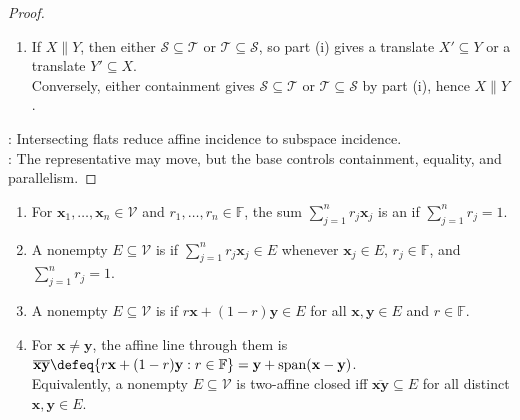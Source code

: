 \begin{proposition}
\begin{proof}
\begin{enumerate}[label=(\roman*)]
\item If $X\parallel Y$, then either $\mathcal{S}\subseteq\mathcal{T}$ or $\mathcal{T}\subseteq\mathcal{S}$, so part (i) gives a translate $X'\subseteq Y$ or a translate $Y'\subseteq X$.\\
Conversely, either containment gives $\mathcal{S}\subseteq\mathcal{T}$ or $\mathcal{T}\subseteq\mathcal{S}$ by part (i), hence $X\parallel Y$.
\end{enumerate}
: Intersecting flats reduce affine incidence to subspace incidence.\\
: The representative may move, but the base controls containment, equality, and parallelism.
\end{proof}
\end{proposition}

\begin{definition} \label{def:affine-combination-and-closed-set} 
\begin{enumerate}[label=(\roman*)]
\setlength{\itemsep}{0pt}
\item For $\mathbf{x}_1,\ldots,\mathbf{x}_n\in\mathcal{V}$ and $r_1,\ldots,r_n\in\mathbb{F}$, the sum $\sum_{j=1}^n r_j\mathbf{x}_j$ is an  if $\sum_{j=1}^n r_j=1$.
\item A nonempty $E\subseteq\mathcal{V}$ is  if $\sum_{j=1}^n r_j\mathbf{x}_j\in E$ whenever $\mathbf{x}_j\in E$, $r_j\in\mathbb{F}$, and $\sum_{j=1}^n r_j=1$.
\item A nonempty $E\subseteq\mathcal{V}$ is  if $r\mathbf{x}+(1-r)\mathbf{y}\in E$ for all $\mathbf{x},\mathbf{y}\in E$ and $r\in\mathbb{F}$.
\item For $\mathbf{x}\neq\mathbf{y}$, the affine line through them is $\overline{\mathbf{x}\mathbf{y}}\defeq\{r\mathbf{x}+(1-r)\mathbf{y}:r\in\mathbb{F}\} =\mathbf{y}+\operatorname{span}(\mathbf{x}-\mathbf{y})$.\\
Equivalently, a nonempty $E\subseteq\mathcal{V}$ is two-affine closed iff $\overline{\mathbf{x}\mathbf{y}}\subseteq E$ for all distinct $\mathbf{x},\mathbf{y}\in E$.
\end{enumerate}
\end{definition}

